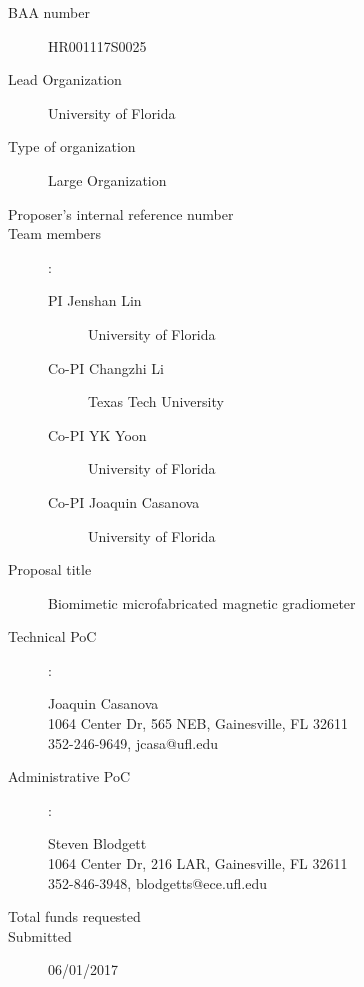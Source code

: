 
\begin{description}
\item [BAA number] HR001117S0025
\item [Lead Organization] University of Florida
\item [Type of organization] Large Organization
\item [Proposer’s internal reference number]
\item [Team members]:
  \begin{description}
  \item [PI Jenshan Lin] University of Florida 
  \item [Co-PI Changzhi Li] Texas Tech University
  \item [Co-PI YK Yoon] University of Florida 
  \item [Co-PI Joaquin Casanova] University of Florida 
  \end{description}
\item [Proposal title] Biomimetic microfabricated magnetic gradiometer
\item [Technical PoC]:
  \begin{description}
  \item [Joaquin Casanova]
  \item [1064 Center Dr, 565 NEB, Gainesville, FL 32611]
  \item [352-246-9649, jcasa@ufl.edu]
  \end{description}
\item [Administrative PoC]:
  \begin{description}
  \item [Steven Blodgett]
  \item [1064 Center Dr, 216 LAR, Gainesville, FL 32611]
  \item [352-846-3948, blodgetts@ece.ufl.edu]
  \end{description}
\item [Total funds requested]
\item [Submitted] 06/01/2017
\end{description}
